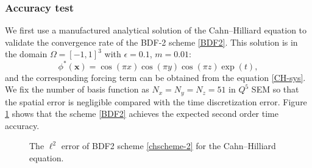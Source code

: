 \documentclass{article}
\newcommand{\bx}{\bm{x}}
\begin{document}
\subsubsection{Accuracy test}
We first use a manufactured analytical solution of the Cahn--Hilliard equation to validate the convergence rate of the BDF-2 scheme \eqref{BDF2}. This solution is in the domain $\Omega=[-1,1]^3$ with $\epsilon = 0.1$, $m=0.01$: 
\begin{equation}
    \phi^{*}(\bx) =\cos(\pi x)\cos(\pi y)\cos(\pi z)\exp(t),
\end{equation}
and the corresponding forcing term can be obtained from the equation \eqref{CH-sys}. We fix the number of basis function as $N_x = N_y = N_z = 51$ in $Q^5$ SEM so that the spatial error is negligible compared with the time discretization error. Figure \ref{fig1:CH_acc} shows that the scheme \eqref{BDF2} achieves the expected second order time accuracy.
\begin{figure}[ht!]
\centering
    \caption{The $\ell^2$ error of BDF2 scheme \eqref{chscheme-2} for the Cahn--Hilliard equation.}
    \label{fig1:CH_acc}
\end{figure}
\end{document}
